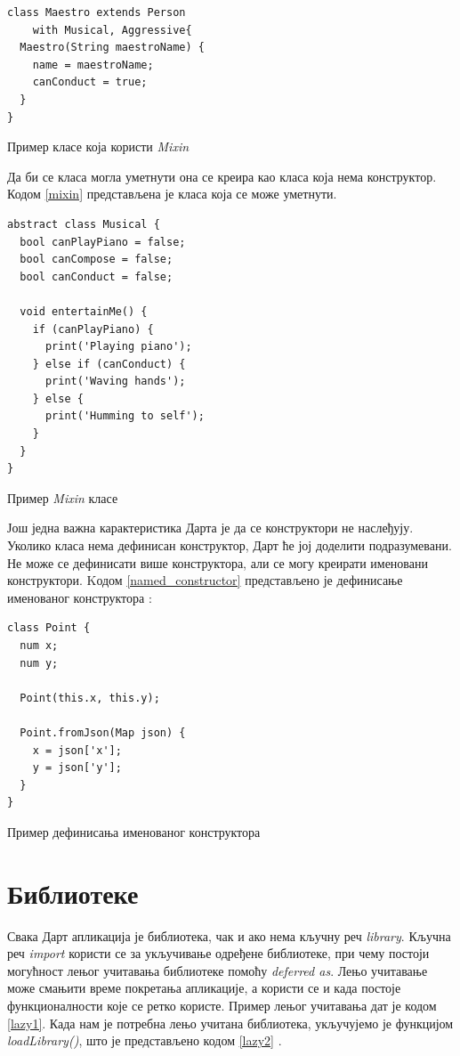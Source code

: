 \documentclass[12pt,oneside]{memoir}
\begin{document}
\begin{listing}
\begin{verbatim}
class Maestro extends Person
    with Musical, Aggressive{
  Maestro(String maestroName) {
    name = maestroName;
    canConduct = true;
  }
}
\end{verbatim}
\caption{Пример класе која користи \textit{Mixin}}
\label{usemixin}
\end{listing}

Да би се класа могла уметнути она се креира као класа која нема конструктор. Кодом \ref{mixin} представљена је класа која се може уметнути.

\begin{listing}
\begin{verbatim}
abstract class Musical {
  bool canPlayPiano = false;
  bool canCompose = false;
  bool canConduct = false;

  void entertainMe() {
    if (canPlayPiano) {
      print('Playing piano');
    } else if (canConduct) {
      print('Waving hands');
    } else {
      print('Humming to self');
    }
  }
}
\end{verbatim}
\caption{Пример \textit{Mixin} класе}
\label{mixin}
\end{listing}

Још једна важна карактеристика Дарта је да се конструктори не наслеђују. Уколико класа нема дефинисан конструктор, Дарт ће јој доделити подразумевани. Не може се дефинисати више конструктора, али се могу креирати именовани конструктори. Kодом \ref{named_constructor} представљено је дефинисање именованог конструктора \cite{dart, dart1}:
\begin{listing}
\begin{verbatim}
class Point {
  num x;
  num y;

  Point(this.x, this.y);

  Point.fromJson(Map json) {
    x = json['x'];
    y = json['y'];
  }
}
\end{verbatim}
\caption{Пример дефинисања именованог конструктора}
\label{named_constructor}
\end{listing}
\section{Библиотеке}
\label{dart_biblioteke}
Свака Дарт апликација је библиотека, чак и ако нема кључну реч \textit{library}. Кључна реч \textit{import} користи се за укључивање одређене библиотеке, при чему постоји могућност лењог учитавања библиотеке помоћу \textit{deferred as}. Лењо учитавање може смањити време покретања апликације, а користи се и када постоје функционалности које се ретко користе. Пример лењог учитавања дат је кодом \ref{lazy1}. Када нам је потребна лењо учитана библиотека, укључујемо је функцијом \textit{loadLibrary()}, што је представљено кодом \ref{lazy2} \cite{dart, dart1}.
\end{document}
